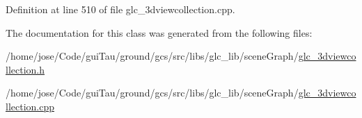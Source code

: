Definition at line 510 of file glc\-\_\-3dviewcollection.\-cpp.



The documentation for this class was generated from the following files\-:\begin{DoxyCompactItemize}
\item 
/home/jose/\-Code/gui\-Tau/ground/gcs/src/libs/glc\-\_\-lib/scene\-Graph/\hyperlink{glc__3dviewcollection_8h}{glc\-\_\-3dviewcollection.\-h}\item 
/home/jose/\-Code/gui\-Tau/ground/gcs/src/libs/glc\-\_\-lib/scene\-Graph/\hyperlink{glc__3dviewcollection_8cpp}{glc\-\_\-3dviewcollection.\-cpp}\end{DoxyCompactItemize}
